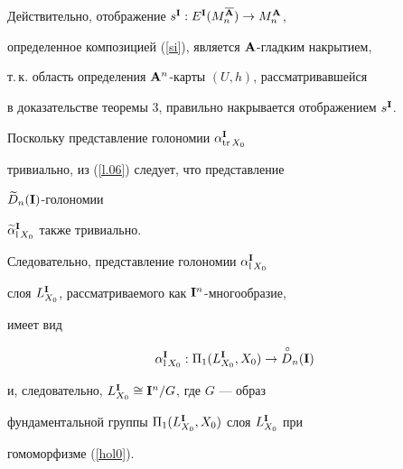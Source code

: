 \begin{pf}


Действительно, отображение $s^{\bold I}:E^{\bold I}(M_n^{\overline{{\bold A}}})\to M_n^{\bold A}$,


определенное композицией (\ref{si}), является ${\bold A}$-гладким накрытием,


т.\,к. область определения ${\bold A}^n$-карты $(U,h)$, рассматривавшейся


в доказательстве теоремы 3, правильно накрывается отображением $s^{\bold I}$.


 


Поскольку представление голономии $\alpha^{\bold I}_{\operatorname{tr} X_0}$


тривиально, из (\ref{l.06}) следует, что представление


$\widetilde D_n({\bold I})$-голономии


$\widetilde\alpha^{\bold I}_{{\mathrm l}\,X_0}$ также тривиально.


Следовательно, представление голономии $\alpha^{\bold I}_{{\mathrm l}\,X_0}$


слоя $L^{\bold I}_{X_0}$, рассматриваемого как ${\bold I}^n$-многообразие,


имеет вид


\begin{equation}


\alpha^\I_{{\mathrm l}\,X_0}:


\Pi_1(L^\I_{X_0},X_0)\to{\puto D}{}_n(\I)


\label{hol0}


\end{equation}


и, следовательно, $L^{\bold I}_{X_0}\cong{\bold I}^n/G$, где $G$ --- образ


фундаментальной группы $\Pi_1(L^{\bold I}_{X_0},X_0)$ слоя $L^{\bold I}_{X_0}$ при


гомоморфизме (\ref{hol0}).


\end{pf}


 








